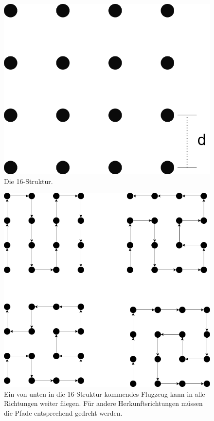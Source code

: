 \documentclass[a4paper,10pt,ngerman]{scrartcl}
\begin{document}
\begin{figure}[t]
  \includegraphics[scale=.2]{struktur}
  \centering
  \caption{Die 16-Struktur.}
\end{figure}
\begin{figure}[t]
  \includegraphics[scale=0.5]{richtungen}
  \centering
  \caption{Ein von unten in die 16-Struktur kommendes Flugzeug kann in alle Richtungen weiter fliegen. Für andere Herkunftsrichtungen müssen die Pfade entsprechend gedreht werden.}
\end{figure}
\end{document}
